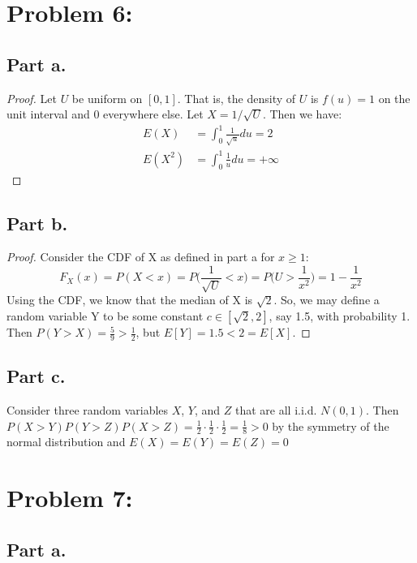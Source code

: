 \documentclass{article}
\begin{document}
\section*{Problem 6:}

\subsection*{Part a.}
\begin{proof}
Let $U$ be uniform on $[0, 1]$. That is, the density of $U$ is $f(u) = 1$ on the unit interval and 0 everywhere else. Let $X = 1 / \sqrt{U}$. Then we have:
\begin{align*}
E(X) &= \int_0^1 \frac{1}{\sqrt{u}} du = 2 \\
E(X^2) &= \int_0^1 \frac{1}{u} du = +\infty
\end{align*}
\end{proof}

\subsection*{Part b.}
\begin{proof}
Consider the CDF of X as defined in part a for $x \geq 1$:
$$
F_X(x) = P(X < x) = P\bigg(\frac{1}{\sqrt{U}} < x\bigg) = P\bigg(U > \frac{1}{x^2}\bigg) = 1 - \frac{1}{x^2}
$$
Using the CDF, we know that the median of X is $\sqrt{2}$. So, we may define a random variable Y to be some constant $c \in [\sqrt{2}, 2]$, say 1.5, with probability 1. Then $P(Y > X) = \frac{5}{9} > \frac{1}{2}$, but $E[Y] = 1.5 < 2 = E[X]$.
\end{proof}

\subsection*{Part c.}

Consider three random variables $X$, $Y$, and $Z$ that are all i.i.d. $N(0, 1)$. Then $P(X > Y)P(Y > Z)P(X > Z) = \frac{1}{2} \cdot \frac{1}{2} \cdot \frac{1}{2} = \frac{1}{8} > 0$ by the symmetry of the normal distribution and $E(X) = E(Y) = E(Z) = 0$

\section*{Problem 7:}

\subsection*{Part a.}
\end{document}

